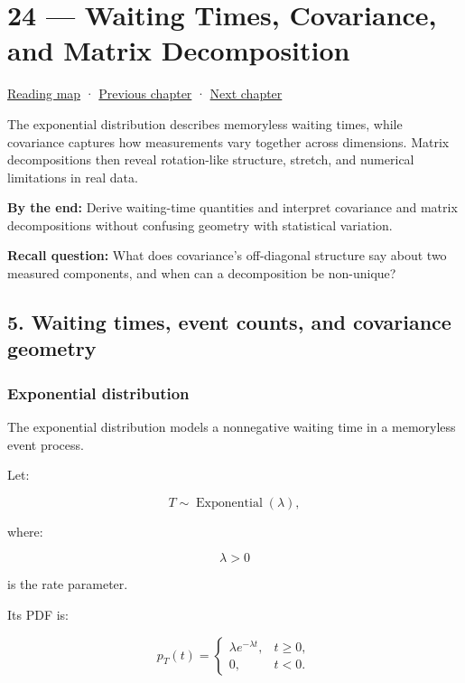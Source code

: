 \hypertarget{02-foundations-ii-ch024}{}
\chapter{24 --- Waiting Times, Covariance, and Matrix Decomposition}\label{02-foundations-ii-ch024-waiting-times-covariance-and-matrix-decomposition}

\hyperref[volume-reading-map]{Reading map} · \hyperref[02-foundations-ii-ch023]{Previous chapter} · \hyperref[02-foundations-ii-ch025]{Next chapter}

The exponential distribution describes memoryless waiting times, while covariance captures how measurements vary together across dimensions. Matrix decompositions then reveal rotation-like structure, stretch, and numerical limitations in real data.

\textbf{By the end:} Derive waiting-time quantities and interpret covariance and matrix decompositions without confusing geometry with statistical variation.

\textbf{Recall question:} What does covariance's off-diagonal structure say about two measured components, and when can a decomposition be non-unique?

\section{5. Waiting times, event counts, and covariance geometry}\label{02-foundations-ii-ch024-waiting-times-event-counts-and-covariance-geometry}

\subsection{Exponential distribution}\label{02-foundations-ii-ch024-exponential-distribution}

The exponential distribution models a nonnegative waiting time in a memoryless event process.

Let:

\[
 T\sim\operatorname{Exponential}(\lambda),
\]

where:

\[
 \lambda>0
\]

is the rate parameter.

Its PDF is:

\[
 \boxed{ p_T(t)= \begin{cases} \lambda e^{-\lambda t},&t\ge0,\\ 0,&t<0. \end{cases} }
\]

